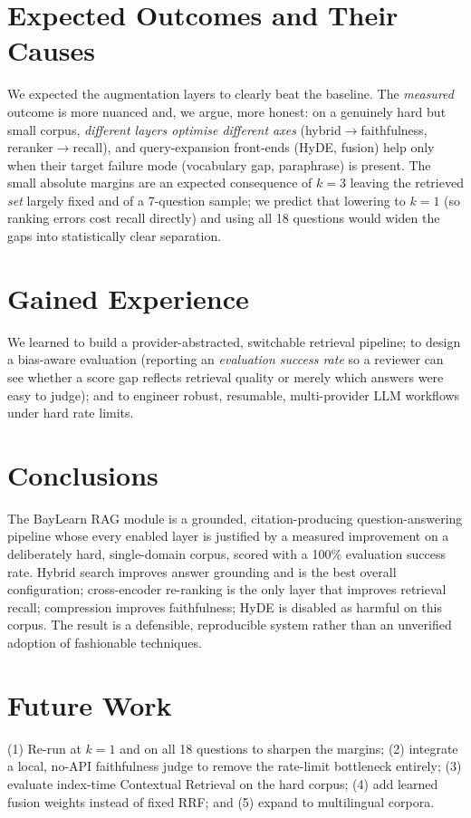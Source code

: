 \documentclass[12pt,a4paper]{report}
\begin{document}
\section{Expected Outcomes and Their Causes}
We expected the augmentation layers to clearly beat the baseline. The
\emph{measured} outcome is more nuanced and, we argue, more honest: on a genuinely
hard but small corpus, \emph{different layers optimise different axes}
(hybrid$\rightarrow$faithfulness, reranker$\rightarrow$recall), and query-expansion
front-ends (HyDE, fusion) help only when their target failure mode (vocabulary gap,
paraphrase) is present. The small absolute margins are an expected consequence of
$k=3$ leaving the retrieved \emph{set} largely fixed and of a 7-question sample;
we predict that lowering to $k=1$ (so ranking errors cost recall directly) and
using all 18 questions would widen the gaps into statistically clear separation.

\section{Gained Experience}
We learned to build a provider-abstracted, switchable retrieval pipeline; to
design a bias-aware evaluation (reporting an \emph{evaluation success rate} so a
reviewer can see whether a score gap reflects retrieval quality or merely which
answers were easy to judge); and to engineer robust, resumable, multi-provider LLM
workflows under hard rate limits.

\section{Conclusions}
The BayLearn RAG module is a grounded, citation-producing question-answering
pipeline whose every enabled layer is justified by a measured improvement on a
deliberately hard, single-domain corpus, scored with a 100\% evaluation success
rate. Hybrid search improves answer grounding and is the best overall
configuration; cross-encoder re-ranking is the only layer that improves retrieval
recall; compression improves faithfulness; HyDE is disabled as harmful on this
corpus. The result is a defensible, reproducible system rather than an unverified
adoption of fashionable techniques.

\section{Future Work}
(1) Re-run at $k=1$ and on all 18 questions to sharpen the margins;
(2) integrate a local, no-API faithfulness judge to remove the rate-limit
bottleneck entirely; (3) evaluate index-time Contextual Retrieval on the hard
corpus; (4) add learned fusion weights instead of fixed RRF; and (5) expand to
multilingual corpora.
\end{document}
